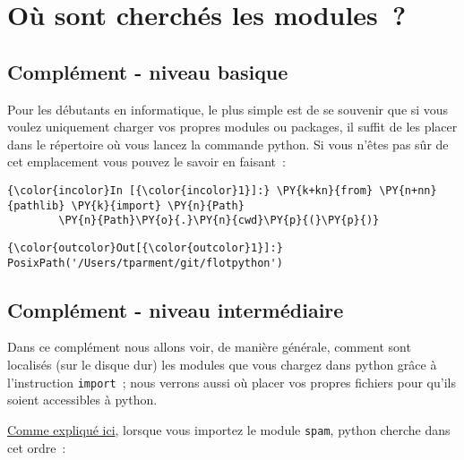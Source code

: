     
    
    
    

    

    \hypertarget{ouxf9-sont-cherchuxe9s-les-modules}{%
\section{Où sont cherchés les
modules~?}\label{ouxf9-sont-cherchuxe9s-les-modules}}

    \hypertarget{compluxe9ment---niveau-basique}{%
\subsection{Complément - niveau
basique}\label{compluxe9ment---niveau-basique}}

    Pour les débutants en informatique, le plus simple est de se souvenir
que si vous voulez uniquement charger vos propres modules ou packages,
il suffit de les placer dans le répertoire où vous lancez la commande
python. Si vous n'êtes pas sûr de cet emplacement vous pouvez le savoir
en faisant~:

    \begin{Verbatim}[commandchars=\\\{\}]
{\color{incolor}In [{\color{incolor}1}]:} \PY{k+kn}{from} \PY{n+nn}{pathlib} \PY{k}{import} \PY{n}{Path}
        \PY{n}{Path}\PY{o}{.}\PY{n}{cwd}\PY{p}{(}\PY{p}{)}
\end{Verbatim}


\begin{Verbatim}[commandchars=\\\{\}]
{\color{outcolor}Out[{\color{outcolor}1}]:} PosixPath('/Users/tparment/git/flotpython')
\end{Verbatim}
            
    \hypertarget{compluxe9ment---niveau-intermuxe9diaire}{%
\subsection{Complément - niveau
intermédiaire}\label{compluxe9ment---niveau-intermuxe9diaire}}

    Dans ce complément nous allons voir, de manière générale, comment sont
localisés (sur le disque dur) les modules que vous chargez dans python
grâce à l'instruction \texttt{import}~; nous verrons aussi où placer vos
propres fichiers pour qu'ils soient accessibles à python.

    \href{https://docs.python.org/3/tutorial/modules.html\#the-module-search-path}{Comme
expliqué ici}, lorsque vous importez le module \texttt{spam}, python
cherche dans cet ordre~:

